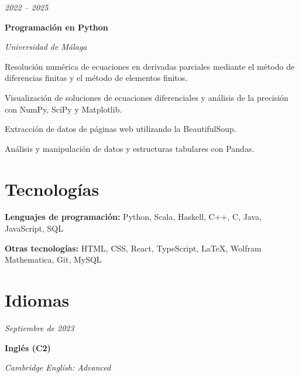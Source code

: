 \documentclass[10pt, letterpaper]{article}
\begin{document}
        \begin{twocolentry}{
            
        \textit{2022 – 2025}}
            \textbf{Programación en Python}

            \textit{Universidad de Málaga}
        \end{twocolentry}

        \vspace{0.10 cm}
        \begin{onecolentry}
            \begin{highlights}
                \item Resolución numérica de ecuaciones en derivadas parciales mediante el método de diferencias finitas y el método de elementos finitos.
                \item Visualización de soluciones de ecuaciones diferenciales y análisis de la precisión con NumPy, SciPy y Matplotlib.
                \item Extracción de datos de páginas web utilizando la BeautifulSoup.
                \item Análisis y manipulación de datos y estructuras tabulares con Pandas.
            \end{highlights}
        \end{onecolentry}

    \section{Tecnologías}

        \begin{onecolentry}
            \textbf{Lenguajes de programación:} Python, Scala, Haskell, C++, C, Java, JavaScript, SQL
        \end{onecolentry}

        \vspace{0.2 cm}

        \begin{onecolentry}
            \textbf{Otras tecnologías:} HTML, CSS, React, TypeScript, LaTeX, Wolfram Mathematica, Git, MySQL
        \end{onecolentry}

    \section{Idiomas}

        \begin{twocolentry}{
            
        \textit{Septiembre de 2023}}
            \textbf{Inglés (C2)}

            \textit{Cambridge English: Advanced}
        \end{twocolentry}
\end{document}
